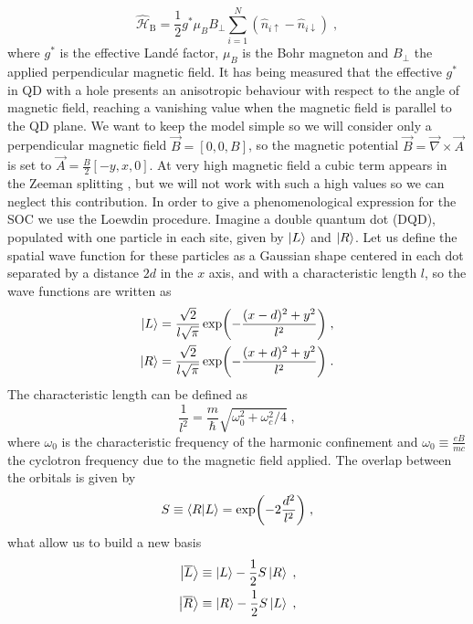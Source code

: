 \begin{equation}
	\hat{\mathcal{H}}_{\text{B}}=\frac{1}{2}g^*\mu_B B_\perp\sum_{i=1}^N(\hat{n}_{i\uparrow}-\hat{n}_{i\downarrow})\; ,
\end{equation}
where $g^*$ is the effective Landé factor, $\mu_B$ is the Bohr magneton and $B_\perp$ the applied perpendicular magnetic field. It has being measured that the effective $g^*$ in QD with a hole presents an anisotropic behaviour \cite{Wang2016} with respect to the angle of magnetic field, reaching a vanishing value when the magnetic field is parallel to the QD plane. We want to keep the model simple so we will consider only a perpendicular magnetic field $\vec{B}=[0,0,B]$, so the magnetic potential $\vec{B}=\vec{\nabla}\times\vec{A}$ is set to $\vec{A}=\frac{B}{2}[-y,x,0]$. At very high magnetic field a cubic term appears in the Zeeman splitting \cite{Hung2017}, but we will not work with such a high values so we can neglect this contribution. In order to give a phenomenological expression for the SOC we use the Loewdin procedure. Imagine a double quantum dot (DQD), populated with one particle in each site, given by $\ket{L}$ and $\ket{R}$. Let us define the spatial wave function for these particles as a Gaussian shape centered in each dot separated by a distance $2d$ in the $x$ axis, and with a characteristic length $l$, so the wave functions are written as
\begin{equation}
	\begin{split}
	\ket{L}&=\frac{\sqrt{2}}{l\sqrt{\pi}}\exp(-\frac{(x-d)^2+y^2}{l^2})\; ,\\
	\ket{R}&=\frac{\sqrt{2}}{l\sqrt{\pi}}\exp(-\frac{(x+d)^2+y^2}{l^2})\; .\\
	\end{split}
\end{equation}
The characteristic length can be defined as
\begin{equation}
	\frac{1}{l^2}=\frac{m}{\hbar}\sqrt{\omega_0^2+\omega_c^2/4}\; ,
\end{equation}
where $\omega_0$ is the characteristic frequency of the harmonic confinement and $\omega_0\equiv \frac{eB}{mc}$ the cyclotron frequency due to the magnetic field applied. The overlap between the orbitals is given by
\begin{equation}
	S\equiv \braket{R}{L}=\exp(-2\frac{d^2}{l^2})\; ,
\end{equation}
what allow us to build a new basis
\begin{equation}
	\begin{split}
	\ket{\overline{L}}\equiv \ket{L}-\frac{1}{2}S\ket{R}\; ,\\
	\ket{\overline{R}}\equiv \ket{R}-\frac{1}{2}S\ket{L}\; ,\\
	\end{split}
\end{equation}
